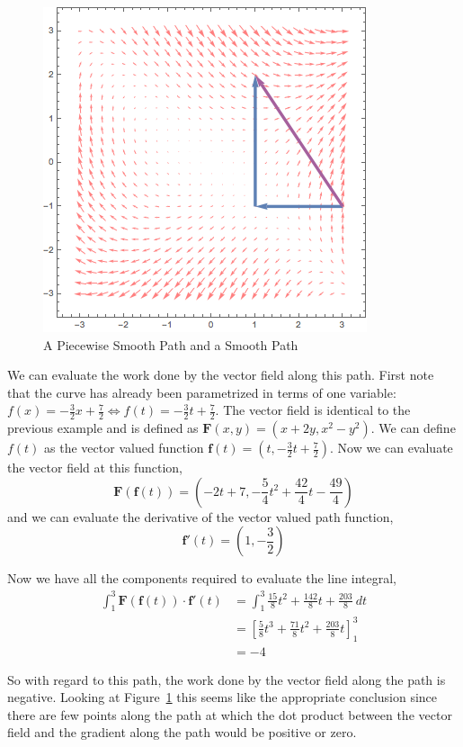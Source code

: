 \documentclass[12pt]{article}
\begin{document}
\begin{figure}[h]
\centering
\caption{A Piecewise Smooth Path and a Smooth Path}
\label{fig:lineintegralexample2}
\indent\includegraphics[scale=0.6]{line_integral_example2.png}
\end{figure}

 We can evaluate the work done by the vector field along this path. First note that the curve has already been parametrized in terms of one variable: $f(x) = -\frac{3}{2}x + \frac{7}{2} \Leftrightarrow f(t) = -\frac{3}{2}t + \frac{7}{2}$. The vector field is identical to the previous example and is defined as $\mathbf{F}(x,y) = (x+2y, x^2-y^2)$. We can define $f(t)$ as the vector valued function $\mathbf{f}(t) = (t,-\frac{3}{2}t+\frac{7}{2})$. Now we can evaluate the vector field at this function, \\
\[
\mathbf{F}(\mathbf{f}(t)) = \left( -2t + 7, -\frac{5}{4}t^2 + \frac{42}{4}t - \frac{49}{4} \right)
\]
and we can evaluate the derivative of the vector valued path function,
\[
\mathbf{f}'(t) = \left( 1, -\frac{3}{2} \right)
\]

 Now we have all the components required to evaluate the line integral,
\begin{align*}
\int_1^3 \mathbf{F}(\mathbf{f}(t))\cdot\mathbf{f}'(t) &= \int_1^3  \frac{15}{8}t^2 + \frac{142}{8}t + \frac{203}{8} \ dt\\
&= \left[ \frac{5}{8}t^3 + \frac{71}{8}t^2 + \frac{203}{8}t \right]_1^3 \\
&= -4
\end{align*}

 So with regard to this path, the work done by the vector field along the path is negative.  Looking at Figure~\ref{fig:lineintegralexample2} this seems like the appropriate conclusion since there are few points along the path at which the dot product between the vector field and the gradient along the path would be positive or zero.\\
\end{document}
